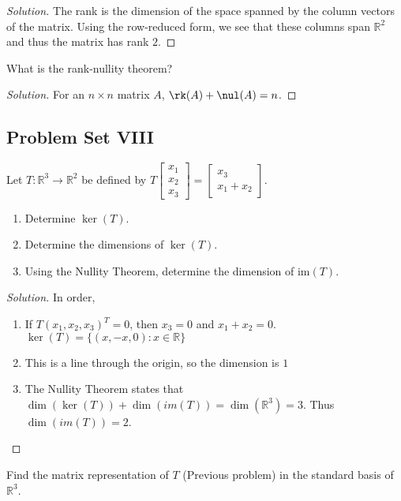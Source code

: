     \begin{proof}[Solution]
    The rank is the dimension of the space spanned by the column vectors of the matrix. Using the row-reduced form, we see that these columns span $\mathbb{R}^2$ and thus the matrix has rank $2$.
    \end{proof}
    \begin{problem}
    What is the rank-nullity theorem?
    \end{problem}
    \begin{proof}[Solution]
    For an $n\times n$ matrix $A$, $\rk(A)+\nul(A) = n$.
    \end{proof}
    \newpage
    \subsection{Problem Set VIII}
    \begin{problem}
    Let $T:\mathbb{R}^3\rightarrow \mathbb{R}^2$ be defined by $T\begin{bmatrix} x_1 \\ x_2 \\ x_3 \end{bmatrix} = \begin{bmatrix} x_3 \\ x_1+x_2 \end{bmatrix}$.
    \begin{enumerate}
        \item Determine $\ker(T)$.
        \item Determine the dimensions of $\ker(T)$.
        \item Using the Nullity Theorem, determine the dimension of im$(T)$.
    \end{enumerate}
    \end{problem}
    \begin{proof}[Solution]
    In order,
    \begin{enumerate}
        \item If $T(x_{1},x_{2},x_{3})^{T} = 0$, then $x_3=0$ and $x_{1}+x_{2}=0$. $\ker(T)=\{(x,-x,0):x\in \mathbb{R}\}$
        \item This is a line through the origin, so the dimension is $1$ 
        \item The Nullity Theorem states that $\dim(\ker(T))+\dim(im(T)) = \dim(\mathbb{R}^3) = 3$. Thus $\dim(im(T)) = 2$.
    \end{enumerate}
    \end{proof}
    \begin{problem}
    Find the matrix representation of $T$ (Previous problem) in the standard basis of $\mathbb{R}^3$.
    \end{problem}
